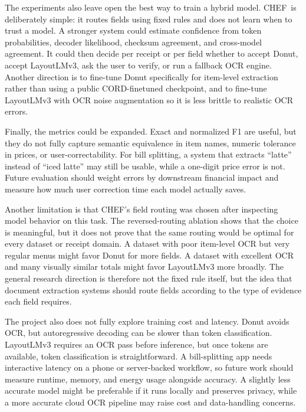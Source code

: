 \documentclass[9pt,twocolumn,twoside]{extarticle}
\newcommand{\cord}{\textsc{CORD}}
\newcommand{\chef}{\textsc{CHEF}}
\begin{document}
The experiments also leave open the best way to train a hybrid model. \chef\ is deliberately simple: it routes fields using fixed rules and does not learn when to trust a model. A stronger system could estimate confidence from token probabilities, decoder likelihood, checksum agreement, and cross-model agreement. It could then decide per receipt or per field whether to accept Donut, accept LayoutLMv3, ask the user to verify, or run a fallback OCR engine. Another direction is to fine-tune Donut specifically for item-level extraction rather than using a public \cord-finetuned checkpoint, and to fine-tune LayoutLMv3 with OCR noise augmentation so it is less brittle to realistic OCR errors.

Finally, the metrics could be expanded. Exact and normalized F1 are useful, but they do not fully capture semantic equivalence in item names, numeric tolerance in prices, or user-correctability. For bill splitting, a system that extracts ``latte'' instead of ``iced latte'' may still be usable, while a one-digit price error is not. Future evaluation should weight errors by downstream financial impact and measure how much user correction time each model actually saves.

Another limitation is that \chef's field routing was chosen after inspecting model behavior on this task. The reversed-routing ablation shows that the choice is meaningful, but it does not prove that the same routing would be optimal for every dataset or receipt domain. A dataset with poor item-level OCR but very regular menus might favor Donut for more fields. A dataset with excellent OCR and many visually similar totals might favor LayoutLMv3 more broadly. The general research direction is therefore not the fixed rule itself, but the idea that document extraction systems should route fields according to the type of evidence each field requires.

The project also does not fully explore training cost and latency. Donut avoids OCR, but autoregressive decoding can be slower than token classification. LayoutLMv3 requires an OCR pass before inference, but once tokens are available, token classification is straightforward. A bill-splitting app needs interactive latency on a phone or server-backed workflow, so future work should measure runtime, memory, and energy usage alongside accuracy. A slightly less accurate model might be preferable if it runs locally and preserves privacy, while a more accurate cloud OCR pipeline may raise cost and data-handling concerns.
\end{document}
